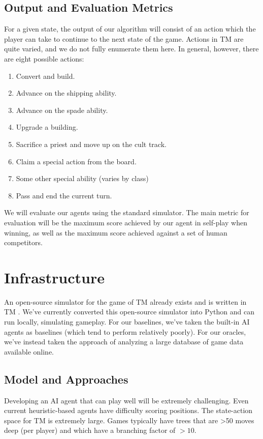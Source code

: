 \documentclass[12pt,twocolumn,letterpaper]{article}
\begin{document}
\subsection{Output and Evaluation Metrics}
For a given state, the output of our algorithm will consist of an action which the player can take to continue to the next state of the game. Actions in TM are quite varied, and we do not fully enumerate them here. In general, however, there are eight possible actions:
\begin{enumerate}
    \item Convert and build.
    \item Advance on the shipping ability.
    \item Advance on the spade ability.
    \item Upgrade a building.
    \item Sacrifice a priest and move up on the cult track.
    \item Claim a special action from the board.
    \item Some other special ability (varies by class)
    \item Pass and end the current turn.
\end{enumerate}

We will evaluate our agents using the standard simulator. The main metric for evaluation will be the maximum score achieved by our agent in self-play when winning, as well as the maximum score achieved against a set of human competitors.

\section{Infrastructure}
An open-source simulator for the game of TM already exists and is written in TM \cite{infra}. We've currently converted this open-source simulator into Python and can run locally, simulating gameplay. For our baselines, we've taken the built-in AI agents as baselines (which tend to perform relatively poorly). For our oracles, we've instead taken the approach of analyzing a large database of game data available online.

\subsection{Model and Approaches}
Developing an AI agent that can play well will be extremely challenging. Even current heuristic-based agents have difficulty scoring positions. The state-action space for TM is extremely large. Games typically have trees that are >50 moves deep (per player) and which have a branching factor of $>10$. 
\end{document}
